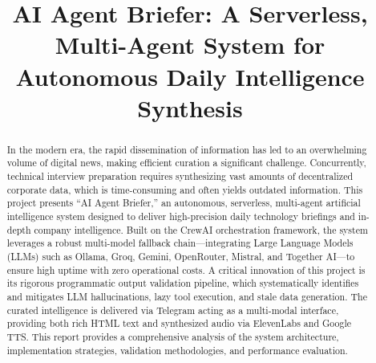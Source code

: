 \documentclass[conference]{IEEEtran}
\begin{document}
\title{AI Agent Briefer: A Serverless, Multi-Agent System for Autonomous Daily Intelligence Synthesis\\
}

\author{
\and
{}
}

\maketitle

\begin{abstract}
In the modern era, the rapid dissemination of information has led to an overwhelming volume of digital news, making efficient curation a significant challenge. Concurrently, technical interview preparation requires synthesizing vast amounts of decentralized corporate data, which is time-consuming and often yields outdated information. This project presents ``AI Agent Briefer,'' an autonomous, serverless, multi-agent artificial intelligence system designed to deliver high-precision daily technology briefings and in-depth company intelligence. Built on the CrewAI orchestration framework, the system leverages a robust multi-model fallback chain---integrating Large Language Models (LLMs) such as Ollama, Groq, Gemini, OpenRouter, Mistral, and Together AI---to ensure high uptime with zero operational costs. A critical innovation of this project is its rigorous programmatic output validation pipeline, which systematically identifies and mitigates LLM hallucinations, lazy tool execution, and stale data generation. The curated intelligence is delivered via Telegram acting as a multi-modal interface, providing both rich HTML text and synthesized audio via ElevenLabs and Google TTS. This report provides a comprehensive analysis of the system architecture, implementation strategies, validation methodologies, and performance evaluation.
\end{abstract}
\end{document}
